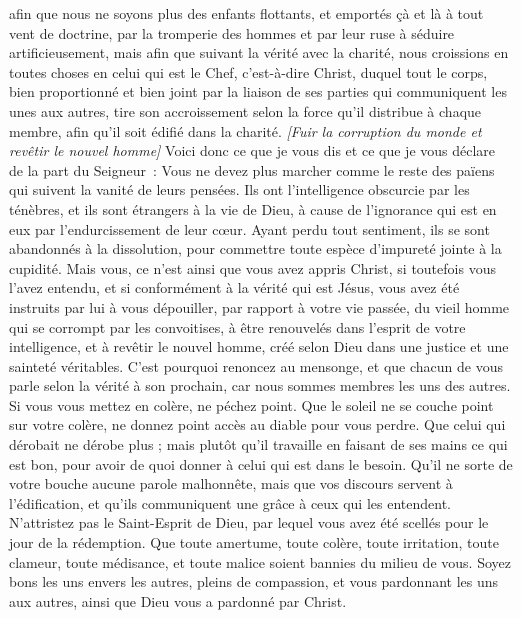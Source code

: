\begin{multicols}{2}
afin que nous ne soyons plus des enfants flottants, et emportés çà et là à tout vent de doctrine, par la tromperie des hommes et par leur ruse à séduire artificieusement,
mais afin que suivant la vérité avec la charité, nous croissions en toutes choses en celui qui est le Chef, c'est-à-dire Christ,
duquel tout le corps, bien proportionné et bien joint par la liaison de ses parties qui communiquent les unes aux autres, tire son accroissement selon la force qu’il distribue à chaque membre, afin qu’il soit édifié dans la charité.
\textit{[Fuir la corruption du monde et revêtir le nouvel homme]}
Voici donc ce que je vous dis et ce que je vous déclare de la part du Seigneur : Vous ne devez plus marcher comme le reste des païens qui suivent la vanité de leurs pensées.
Ils ont l’intelligence obscurcie par les ténèbres, et ils sont étrangers à la vie de Dieu, à cause de l'ignorance qui est en eux par l'endurcissement de leur cœur.
Ayant perdu tout sentiment, ils se sont abandonnés à la dissolution, pour commettre toute espèce d’impureté jointe à la cupidité.
Mais vous, ce n’est ainsi que vous avez appris Christ,
si toutefois vous l'avez entendu, et si conformément à la vérité qui est Jésus, vous avez été instruits par lui à vous dépouiller,
par rapport à votre vie passée, du vieil homme qui se corrompt par les convoitises,
à être renouvelés dans l'esprit de votre intelligence,
et à revêtir le nouvel homme, créé selon Dieu dans une justice et une sainteté véritables.
C'est pourquoi renoncez au mensonge, et que chacun de vous parle selon la vérité à son prochain, car nous sommes membres les uns des autres.
Si vous vous mettez en colère, ne péchez point. Que le soleil ne se couche point sur votre colère,
ne donnez point accès au diable pour vous perdre.
Que celui qui dérobait ne dérobe plus ; mais plutôt qu’il travaille en faisant de ses mains ce qui est bon, pour avoir de quoi donner à celui qui est dans le besoin.
Qu’il ne sorte de votre bouche aucune parole malhonnête, mais que vos discours servent à l’édification, et qu’ils communiquent une grâce à ceux qui les entendent.
N'attristez pas le Saint-Esprit de Dieu, par lequel vous avez été scellés pour le jour de la rédemption.
Que toute amertume, toute colère, toute irritation, toute clameur, toute médisance, et toute malice soient bannies du milieu de vous.
Soyez bons les uns envers les autres, pleins de compassion, et vous pardonnant les uns aux autres, ainsi que Dieu vous a pardonné par Christ.

\end{multicols}
